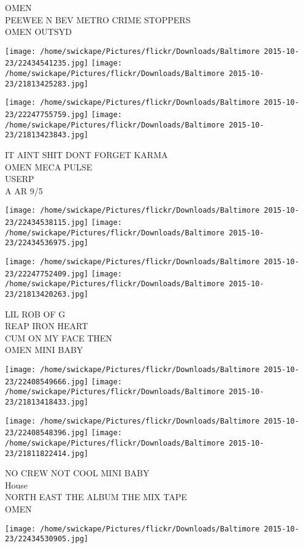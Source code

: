 \documentclass[10pt,letterpaper]{article}
\begin{document}
OMEN\\
PEEWEE N BEV METRO CRIME STOPPERS\\
OMEN OUTSYD
\pagebreak

\texttt{[image: /home/swickape/Pictures/flickr/Downloads/Baltimore 2015-10-23/22434541235.jpg]}
\texttt{[image: /home/swickape/Pictures/flickr/Downloads/Baltimore 2015-10-23/21813425283.jpg]}

\texttt{[image: /home/swickape/Pictures/flickr/Downloads/Baltimore 2015-10-23/22247755759.jpg]}
\texttt{[image: /home/swickape/Pictures/flickr/Downloads/Baltimore 2015-10-23/21813423843.jpg]}

IT AINT SHIT DONT FORGET KARMA\\
OMEN MECA PULSE\\
USERP\\
A AR 9/5
\pagebreak

\texttt{[image: /home/swickape/Pictures/flickr/Downloads/Baltimore 2015-10-23/22434538115.jpg]}
\texttt{[image: /home/swickape/Pictures/flickr/Downloads/Baltimore 2015-10-23/22434536975.jpg]}

\texttt{[image: /home/swickape/Pictures/flickr/Downloads/Baltimore 2015-10-23/22247752409.jpg]}
\texttt{[image: /home/swickape/Pictures/flickr/Downloads/Baltimore 2015-10-23/21813420263.jpg]}

LIL ROB OF G\\
REAP IRON HEART\\
CUM ON MY FACE THEN\\
OMEN MINI BABY
\pagebreak

\texttt{[image: /home/swickape/Pictures/flickr/Downloads/Baltimore 2015-10-23/22408549666.jpg]}
\texttt{[image: /home/swickape/Pictures/flickr/Downloads/Baltimore 2015-10-23/21813418433.jpg]}

\texttt{[image: /home/swickape/Pictures/flickr/Downloads/Baltimore 2015-10-23/22408548396.jpg]}
\texttt{[image: /home/swickape/Pictures/flickr/Downloads/Baltimore 2015-10-23/21811822414.jpg]}

NO CREW NOT COOL MINI BABY\\
House\\
NORTH EAST THE ALBUM THE MIX TAPE\\
OMEN
\pagebreak

\texttt{[image: /home/swickape/Pictures/flickr/Downloads/Baltimore 2015-10-23/22434530905.jpg]}
\end{document}
